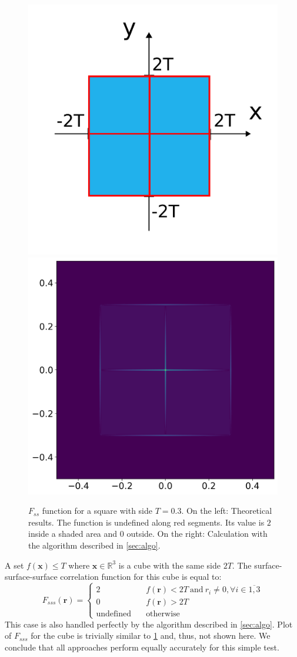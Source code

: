 \documentclass[1p]{elsarticle}
\begin{document}
\begin{figure}
  \centering
  \includegraphics[width=0.45\linewidth]{images/fss-square.png}
  \hfill
  \includegraphics[width=0.45\linewidth]{images/fss-square-julia.png}
  \caption[]{$F_{ss}$ function for a square with side $T = 0.3$. On the left:
    Theoretical results. The function is undefined along red segments. Its value
    is $2$ inside a shaded area and $0$ outside. On the right: Calculation with
    the algorithm described in \cref{sec:algo}.}
  \label{fig:fss-square}
\end{figure}

A set $f(\bm{x}) \le T$ where $\bm{x} \in \mathbb{R}^3$ is a cube with the same
side $2T$.
The surface-surface-surface correlation function for this cube is equal to:
\begin{equation}
  F_{sss}(\bm{r}) = \left\{
  \begin{array}{ll}
    2 & \quad f(\bm{r}) < 2T \ \text{and}\ r_i \ne 0, \forall i \in \overline{1,3} \\
    0 & \quad f(\bm{r}) > 2T \\
    \text{undefined} & \quad \text{otherwise}
  \end{array}
  \right.
\end{equation}
This case is also handled perfectly by the algorithm described in
\cref{sec:algo}. Plot of $F_{sss}$ for the cube is trivially similar to
\cref{fig:fss-square} and, thus, not shown here. We conclude that all approaches
perform equally accurately for this simple test.
\end{document}
